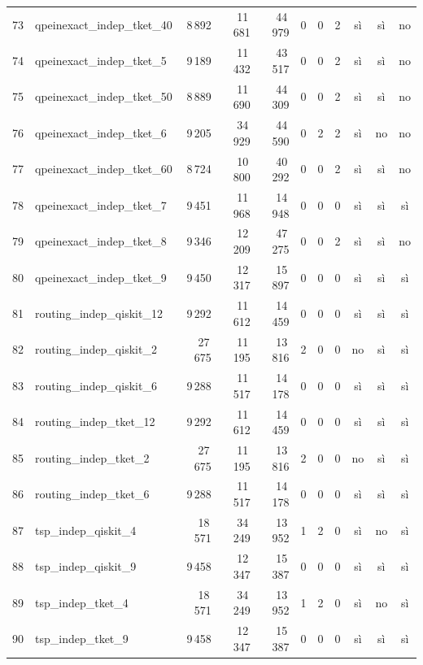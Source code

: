 \documentclass[a4paper,10pt]{article}
\begin{document}
\begin{landscape}
\begin{longtable}{r l rrr rrr ccc}
73 & qpeinexact\_indep\_tket\_40 & 8\,892 & 11\,681 & 44\,979 & 0 & 0 & 2 & sì & sì & no\\
74 & qpeinexact\_indep\_tket\_5 & 9\,189 & 11\,432 & 43\,517 & 0 & 0 & 2 & sì & sì & no\\
75 & qpeinexact\_indep\_tket\_50 & 8\,889 & 11\,690 & 44\,309 & 0 & 0 & 2 & sì & sì & no\\
76 & qpeinexact\_indep\_tket\_6 & 9\,205 & 34\,929 & 44\,590 & 0 & 2 & 2 & sì & no & no\\
77 & qpeinexact\_indep\_tket\_60 & 8\,724 & 10\,800 & 40\,292 & 0 & 0 & 2 & sì & sì & no\\
78 & qpeinexact\_indep\_tket\_7 & 9\,451 & 11\,968 & 14\,948 & 0 & 0 & 0 & sì & sì & sì\\
79 & qpeinexact\_indep\_tket\_8 & 9\,346 & 12\,209 & 47\,275 & 0 & 0 & 2 & sì & sì & no\\
80 & qpeinexact\_indep\_tket\_9 & 9\,450 & 12\,317 & 15\,897 & 0 & 0 & 0 & sì & sì & sì\\
81 & routing\_indep\_qiskit\_12 & 9\,292 & 11\,612 & 14\,459 & 0 & 0 & 0 & sì & sì & sì\\
82 & routing\_indep\_qiskit\_2 & 27\,675 & 11\,195 & 13\,816 & 2 & 0 & 0 & no & sì & sì\\
83 & routing\_indep\_qiskit\_6 & 9\,288 & 11\,517 & 14\,178 & 0 & 0 & 0 & sì & sì & sì\\
84 & routing\_indep\_tket\_12 & 9\,292 & 11\,612 & 14\,459 & 0 & 0 & 0 & sì & sì & sì\\
85 & routing\_indep\_tket\_2 & 27\,675 & 11\,195 & 13\,816 & 2 & 0 & 0 & no & sì & sì\\
86 & routing\_indep\_tket\_6 & 9\,288 & 11\,517 & 14\,178 & 0 & 0 & 0 & sì & sì & sì\\
87 & tsp\_indep\_qiskit\_4 & 18\,571 & 34\,249 & 13\,952 & 1 & 2 & 0 & sì & no & sì\\
88 & tsp\_indep\_qiskit\_9 & 9\,458 & 12\,347 & 15\,387 & 0 & 0 & 0 & sì & sì & sì\\
89 & tsp\_indep\_tket\_4 & 18\,571 & 34\,249 & 13\,952 & 1 & 2 & 0 & sì & no & sì\\
90 & tsp\_indep\_tket\_9 & 9\,458 & 12\,347 & 15\,387 & 0 & 0 & 0 & sì & sì & sì\\
\end{longtable}\endgroup\end{landscape}
\end{document}
